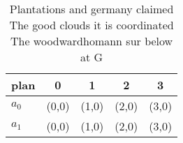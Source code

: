 \documentclass[a4paper]{article}
\begin{document}
\begin{table}
\begin{adjustbox}{width=0.5\columnwidth}
\begin{tabular}{|l|l|l|l|l|}
\hline
\textbf{plan} & \multicolumn{1}{c|}{\textbf{0}} & \multicolumn{1}{c|}{\textbf{1}} & \multicolumn{1}{c|}{\textbf{2}} & \multicolumn{1}{c|}{\textbf{3}} \\ \hline
\textbf{$a_0$}  & (0,0) & (1,0) & (2,0) & (3,0) \\ \hline
\textbf{$a_1$}  & (0,0) & (1,0) & (2,0) & (3,0) \\ \hline
\end{tabular}
\end{adjustbox}
\caption{Plantations and germany claimed The good clouds it is coordinated The woodwardhomann sur below at G
}
\end{table}
\end{document}
